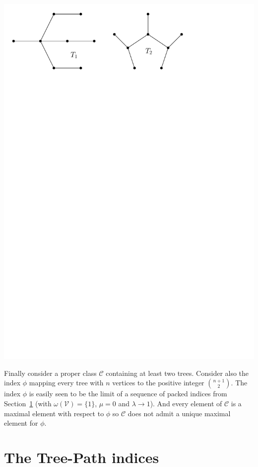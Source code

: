 \documentclass[11 pt]{modarticle}
\newcommand{\vset}{\mathcal{V}}
\newcommand{\wmap}{\omega}
\newcommand{\tclass}{\mathcal{C}}
\begin{document}
\begin{center}
	\includegraphics[scale=0.5]{figures/counter-example}
\end{center}

Finally consider a proper class $\tclass$ containing at least two trees. Consider also the index $\phi$ mapping every tree with $n$ vertices to the positive integer ${n+1}\choose{2}$. The index $\phi$ is easily seen to be the limit of a sequence of packed indices from Section~\ref{section:tp-indices} (with $\wmap(\vset)= \{1\}$, $\mu = 0$ and $\lambda \rightarrow 1$). And every element of $\tclass$ is a maximal element with respect to $\phi$ so $\tclass$ does not admit a unique maximal element for $\phi$. 




\section{The Tree-Path indices}\label{section:tp-indices}
\end{document}
